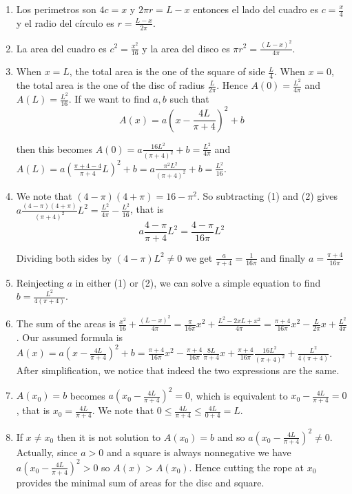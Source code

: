 \begin{enumerate}
\item Los perimetros son $4c = x$ y $2 \pi r = L - x$ entonces
  el lado del cuadro es $c = \frac{x}{4}$ y el radio del círculo es
  $r = \frac{L-x}{2 \pi}$.
\item La area del cuadro es $c^2 = \frac{x^2}{16}$ y la area del disco
  es $\pi r^2 = \frac{{(L-x)}^2}{4\pi}$.

\item When $x= L$, the total area is the one of the square of side
  $\frac{L}{4}$. When $x = 0$, the total area is the one of the disc of
  radius $\frac{L}{2\pi}$.
  Hence $A(0) = \frac{L^2}{4\pi}$ and $A(L) = \frac{L^2}{16}$. If we want
  to find $a,b$ such that
  $$
  A(x) = a \left( x - \frac{4L}{\pi+4}\right)^2 + b
  $$

  then this becomes
  $A(0) = a \frac{16L^2}{\left(\pi+4\right)^2} + b = \frac{L^2}{4\pi}$
  and $A(L) = 
  a \left(\frac{\pi+4-4}{\pi+4}L\right)^2 + b =
  a \frac{\pi^2L^2}{\left(\pi+4\right)^2} + b = \frac{L^2}{16}$.

\item We note that ${(4-\pi)}{(4+\pi)} = 16 - \pi^2$.
  So subtracting (1) and (2) gives
  $a \frac{{(4-\pi)}{(4+\pi)}}{\left(\pi+4\right)^2} L^2 =
  \frac{L^2}{4\pi} - \frac{L^2}{16}$, that is
  $$a \frac{4-\pi}{\pi+4} L^2 = \frac{4-\pi}{16\pi} L^2$$

  Dividing both sides by ${(4-\pi)} L^2 \neq 0$ we get
  $\frac{a}{\pi+4} = \frac{1}{16\pi}$ and finally
  $a = \frac{\pi+4}{16\pi}$
  
\item Reinjecting $a$ in either (1) or (2), we can solve a simple
  equation to find $b = \frac{L^2}{4\left(\pi+4\right)}$.

\item The sum of the areas is
  $\frac{x^2}{16} + \frac{\left(L-x\right)^2}{4\pi} =
  \frac{\pi}{16\pi}x^2 + \frac{L^2 - 2xL + x^2}{4\pi} =
  \frac{\pi+4}{16\pi} x^2 - \frac{L}{2\pi}x + \frac{L^2}{4\pi}$.
  Our assumed formula is
  $A(x) = a \left( x - \frac{4L}{\pi+4}\right)^2 + b =
  \frac{\pi+4}{16\pi} x^2 - \frac{\pi+4}{16\pi} \frac{8L}{\pi+4} x +
  \frac{\pi+4}{16\pi} \frac{16L^2}{\left(\pi+4\right)^2} +
  \frac{L^2}{4\left(\pi+4\right)}$. After simplification, we notice that
  indeed the two expressions are the same.

\item $A(x_0) = b$ becomes $a \left(x_0 - \frac{4L}{\pi+4}\right)^2 = 0$,
  which is equivalent to $x_0 - \frac{4L}{\pi+4} = 0$, that is
  $x_0 = \frac{4L}{\pi+4}$.
  We note that $0 \leq \frac{4L}{\pi+4} \leq \frac{4L}{0+4} = L$.
  
\item If $x \neq x_0$ then it is not solution to
  $A(x_0) = b$ and so $a \left(x_0 - \frac{4L}{\pi+4}\right)^2 \neq 0$.
  Actually, since $a > 0$ and a square is always nonnegative we have
  $a \left(x_0 - \frac{4L}{\pi+4}\right)^2 > 0$
  so $A(x) > A(x_0)$. Hence cutting the rope at $x_0$ provides the minimal sum
  of areas for the disc and square.
\end{enumerate}

